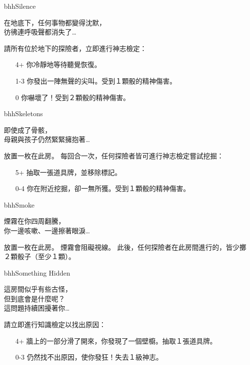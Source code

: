 \linebreak[0]%
\begin{EventCard}{bhh}{Silence}
  \begin{CardStory}
    在地底下，任何事物都變得沈默，\\
    彷彿連呼吸聲都消失了…
  \end{CardStory}
  請所有位於地下的探險者，立即進行神志檢定：
  \begin{itemize}
    \item[4+] 你冷靜地等待聽覺恢復。
    \item[1-3] 你發出一陣無聲的尖叫。受到１顆骰的精神傷害。
    \item[0] 你嚇壞了！受到２顆骰的精神傷害。
  \end{itemize}
\end{EventCard}%
\linebreak[0]%
\begin{EventCard}{bhh}{Skeletons}
  \begin{CardStory}
    即使成了骨骸，\\
    母親與孩子仍然緊緊擁抱著…
  \end{CardStory}
  放置一枚在此房。\smallbreak
  每回合一次，任何探險者皆可進行神志檢定嘗試挖掘：
  \begin{itemize}
    \item[5+] 抽取一張道具牌，並移除標記。
    \item[0-4] 你在附近挖掘，卻一無所獲。受到１顆骰的精神傷害。
  \end{itemize}
\end{EventCard}%
\linebreak[0]%
\begin{EventCard}{bhh}{Smoke}
  \begin{CardStory}
    煙霧在你四周翻騰，\\
    你一邊咳嗽、一邊擦著眼淚…
  \end{CardStory}
  放置一枚在此房。\smallbreak
  煙霧會阻礙視線。\smallbreak
  此後，任何探險者在此房間進行的，皆少擲２顆骰子（至少１顆）。\smallbreak
\end{EventCard}%
\linebreak[0]%
\begin{EventCard}{bhh}{Something Hidden}
  \begin{CardStory}
    這房間似乎有些古怪，\\
    但到底會是什麼呢？\\
    這問題持續困擾著你…
  \end{CardStory}
  請立即進行知識檢定以找出原因：
  \begin{itemize}
    \item[4+] 牆上的一部分滑了開來，你發現了一個壁櫥。抽取１張道具牌。
    \item[0-3] 仍然找不出原因，使你發狂！失去１級神志。
  \end{itemize}
\end{EventCard}%
